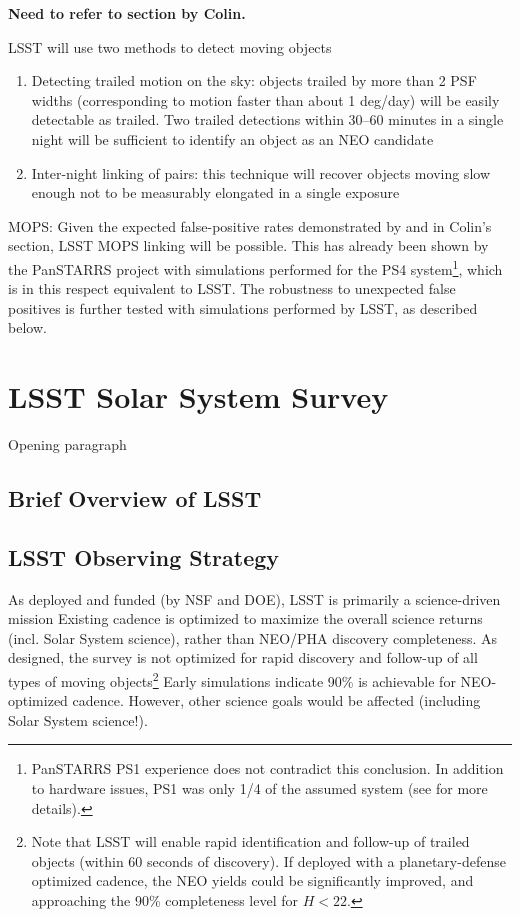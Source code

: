 \documentclass[12pt,preprint]{aastex}
\begin{document}
{\bf Need to refer to section by Colin.} 

LSST will use two methods to detect moving objects
\begin{enumerate}
\item Detecting trailed motion on the sky:  objects trailed by more
  than 2 PSF widths (corresponding to motion faster than about 1
  deg/day) will be easily detectable as trailed.  Two trailed
  detections within 30--60 minutes in a single night will be
  sufficient to identify an object as an NEO candidate
\item Inter-night linking of pairs: this technique will recover
  objects moving slow enough not to be measurably elongated in 
  a single exposure
\end{enumerate} 

MOPS: Given the expected false-positive rates demonstrated by
\cite{goldstein15} and in Colin's  section, LSST MOPS linking will
be possible. This has already been shown by the PanSTARRS project 
with simulations performed for the PS4 system\footnote{PanSTARRS 
PS1 experience does not contradict this conclusion. In addition to 
hardware issues, PS1 was only 1/4 of the assumed system (see 
\citep{denneau13} for more details). }, which is in this
respect equivalent to LSST. The robustness to unexpected false
positives is further tested with simulations performed by LSST,
as described below. 







\section{LSST Solar System Survey} 

Opening paragraph


\subsection{Brief Overview of LSST} 
% 

\subsection{LSST Observing Strategy} 

As deployed and funded (by NSF and DOE), LSST is primarily a science-driven mission
Existing cadence is optimized to maximize the overall science returns
(incl. Solar System science), rather than NEO/PHA discovery
completeness.  As designed, the survey is not optimized for rapid
discovery and follow-up of all types of moving objects\footnote{
Note that LSST will enable rapid identification and follow-up of
trailed objects (within 60 seconds of discovery). If deployed with a 
planetary-defense optimized cadence, the NEO yields could be
significantly improved, and approaching the 90\% completeness level
for $H<22$.} 
Early simulations indicate 90\% is achievable for NEO-optimized
cadence. However, other science goals would be affected (including
Solar System science!). 
\end{document}
